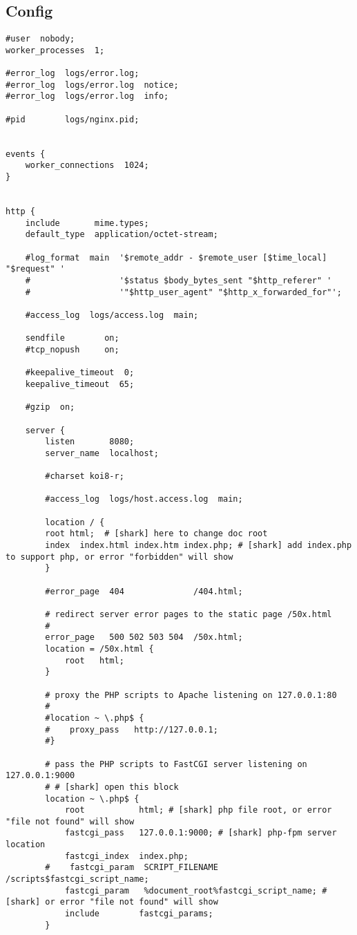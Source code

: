     \subsection{Config}
        \begin{lstlisting}
#user  nobody;
worker_processes  1;

#error_log  logs/error.log;
#error_log  logs/error.log  notice;
#error_log  logs/error.log  info;

#pid        logs/nginx.pid;


events {
    worker_connections  1024;
}


http {
    include       mime.types;
    default_type  application/octet-stream;

    #log_format  main  '$remote_addr - $remote_user [$time_local] "$request" '
    #                  '$status $body_bytes_sent "$http_referer" '
    #                  '"$http_user_agent" "$http_x_forwarded_for"';

    #access_log  logs/access.log  main;

    sendfile        on;
    #tcp_nopush     on;

    #keepalive_timeout  0;
    keepalive_timeout  65;

    #gzip  on;

    server {
        listen       8080;
        server_name  localhost;

        #charset koi8-r;

        #access_log  logs/host.access.log  main;

        location / {
	    root html;  # [shark] here to change doc root
        index  index.html index.htm index.php; # [shark] add index.php to support php, or error "forbidden" will show 
        }

        #error_page  404              /404.html;

        # redirect server error pages to the static page /50x.html
        #
        error_page   500 502 503 504  /50x.html;
        location = /50x.html {
            root   html;
        }

        # proxy the PHP scripts to Apache listening on 127.0.0.1:80
        #
        #location ~ \.php$ {
        #    proxy_pass   http://127.0.0.1;
        #}

        # pass the PHP scripts to FastCGI server listening on 127.0.0.1:9000
        # # [shark] open this block
        location ~ \.php$ {
            root           html; # [shark] php file root, or error "file not found" will show
            fastcgi_pass   127.0.0.1:9000; # [shark] php-fpm server location
            fastcgi_index  index.php;
        #    fastcgi_param  SCRIPT_FILENAME  /scripts$fastcgi_script_name;
            fastcgi_param   %document_root%fastcgi_script_name; # [shark] or error "file not found" will show
            include        fastcgi_params;
        }


\end{lstlisting}
